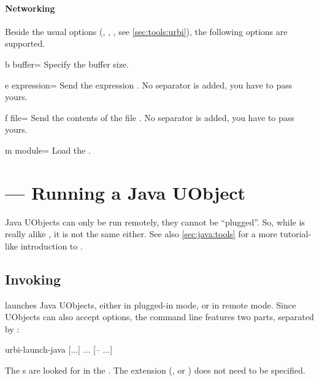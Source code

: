 \paragraph{Networking}
Beside the usual options (, ,
, see \autoref{sec:tools:urbi}), the following options
are supported.
\begin{options}
\item[b]{buffer=} Specify the buffer size.
\end{options}

\begin{options}[Input]
\item[e]{expression=} Send the \us expression .
  No separator is added, you have to pass yours.
\item[f]{file=} Send the contents of the file .
  No separator is added, you have to pass yours.
\item[m]{module=} Load the \UObject {}.
\end{options}

\section{ --- Running a Java UObject}
\label{sec:tools:urbi-launch-java}

Java UObjects can only be run remotely, they cannot be ``plugged''.  So,
while  is really alike , it
is not the same either.  See also \autoref{sec:java:tools} for a more
tutorial-like introduction to .

\subsection{Invoking }

 launches Java UObjects, either in plugged-in
mode, or in remote mode.  Since UObjects can also accept options, the
command line features two parts, separated by \samp{--}:

\begin{shell}
urbi-launch-java [...] ... [-- ...]
\end{shell}

The s are looked for in the .  The
 extension (, or ) does not need to be
specified.

